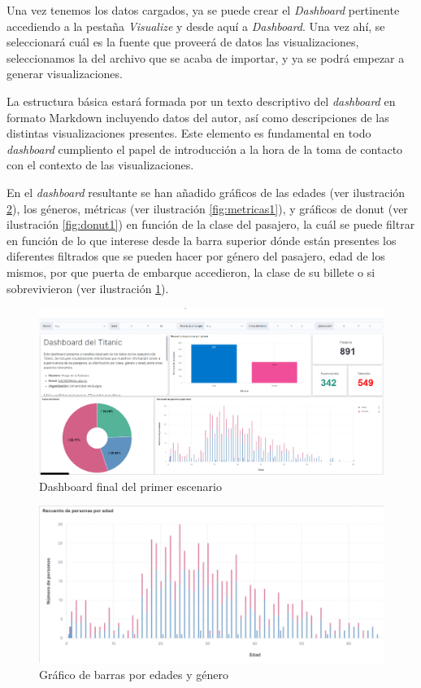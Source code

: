 Una vez tenemos los datos cargados, ya se puede crear el \textit{Dashboard} pertinente accediendo a la pestaña \textit{Visualize} y desde aquí a \textit{Dashboard}. Una vez ahí, se seleccionará cuál es la fuente que proveerá de datos las visualizaciones, seleccionamos la del archivo que se acaba de importar, y ya se podrá empezar a generar visualizaciones.

La estructura básica estará formada por un texto descriptivo del \textit{dashboard} en formato Markdown incluyendo datos del autor, así como descripciones de las distintas visualizaciones presentes. Este elemento es fundamental en todo \textit{dashboard} cumpliento el papel de introducción a la hora de la toma de contacto con el contexto de las visualizaciones.

En el \textit{dashboard} resultante se han añadido gráficos de las edades  (ver ilustración  \ref{fig:barras1}), los géneros, métricas  (ver ilustración  \ref{fig:metricas1}), y gráficos de donut  (ver ilustración  \ref{fig:donut1}) en función de la clase del pasajero, la cuál se puede filtrar en función de lo que interese desde la barra superior dónde están presentes los diferentes filtrados que se pueden hacer por género del pasajero, edad de los mismos, por que puerta de embarque accedieron, la clase de su billete o si sobrevivieron  (ver ilustración  \ref{fig:escenario1}).

\begin{figure}
    \centering
    \includegraphics[width=1\linewidth]{img/escenario1.png}
    \caption{Dashboard final del primer escenario}
    \label{fig:escenario1}
\end{figure}

\begin{figure}
    \centering
    \includegraphics[width=1\linewidth]{img/edades.png}
    \caption{Gráfico de barras por edades y género}
    \label{fig:barras1}
\end{figure}


